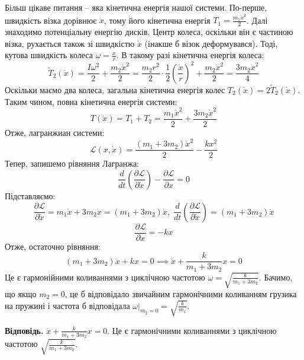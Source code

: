 \documentclass[14pt]{extarticle}
\begin{document}
Більш цікаве питання -- яка кінетична енергія нашої системи. По-перше, швидкість візка дорівнює $\dot{x}$, тому його кінетична енергія $T_1 = \frac{m_1\dot{x}^2}{2}$. Далі знаходимо потенціальну енергію дисків. Центр колеса, оскільки він є частиною візка, рухається також зі швидкістю $\dot{x}$ (інакше б візок деформувався). Тоді, кутова швидкість колеса $\omega = \frac{\dot{x}}{r}$. В такому разі кінетична енергія колеса:
\[
\widetilde{T}_2(\dot{x}) = \frac{I\omega^2}{2} + \frac{m_2\dot{x}^2}{2} = \frac{m_2r^2}{2} \cdot \frac{1}{2} \left(\frac{\dot{x}}{r}\right)^2 + \frac{m_2\dot{x}^2}{2} = \frac{3m_2\dot{x}^2}{4}
\]
Оскільки маємо два колеса, загальна кінетична енергія колес $T_2(\dot{x})=2\widetilde{T}_2(\dot{x})$. Таким чином, повна кінетична енергія системи:
\[
T(\dot{x}) = T_1 + T_2 = \frac{m_1\dot{x}^2}{2} + \frac{3m_2\dot{x}^2}{2}
\]
Отже, лагранжиан системи:
\[
\mathcal{L}(x,\dot{x}) = \frac{(m_1+3m_2)\dot{x}^2}{2} - \frac{kx^2}{2}
\]
Тепер, запишемо рівняння Лагранжа:
\[
\frac{d}{dt}\left(\frac{\partial\mathcal{L}}{\partial\dot{x}}\right) - \frac{\partial\mathcal{L}}{\partial x} = 0
\]
Підставляємо:
\[
\frac{\partial\mathcal{L}}{\partial\dot{x}} = m_1\dot{x} + 3m_2\dot{x} = (m_1+3m_2)\dot{x}, \; \frac{d}{dt}\left(\frac{\partial\mathcal{L}}{\partial\dot{x}}\right) = (m_1+3m_2)\ddot{x}
\]
\[
\frac{\partial\mathcal{L}}{\partial x} = -kx
\]
Отже, остаточно рівняння:
\[
(m_1+3m_2)\ddot{x} + kx = 0 \implies \boxed{\ddot{x} + \frac{k}{m_1+3m_2}x = 0}
\]
Це є гармонійними коливаннями з циклічною частотою $\omega=\sqrt{\frac{k}{m_1+3m_2}}$. Бачимо, що якщо $m_2=0$, це б відповідало звичайним гармонічними коливанням грузика на пружині і частота б відповідала $\omega\Big|_{m_2=0}=\sqrt{\frac{k}{m_1}}$. 

\textbf{Відповідь.} $\ddot{x} + \frac{k}{m_1+3m_2}x = 0$. Це є гармонічними коливаннями з циклічною частотою $\sqrt{\frac{k}{m_1+3m_2}}$.
\end{document}
